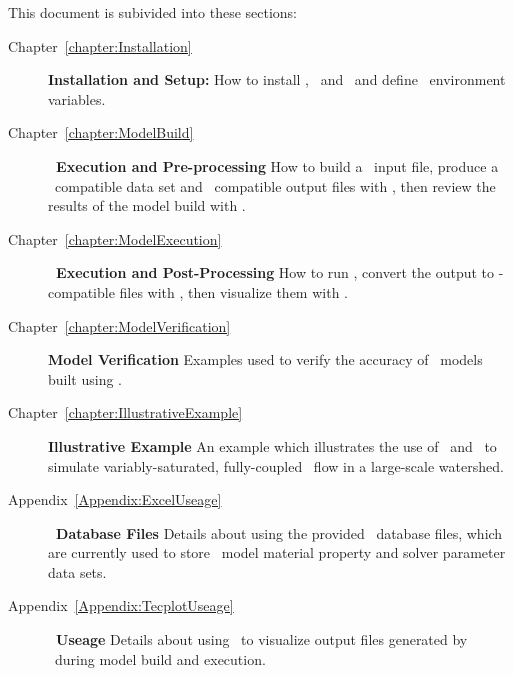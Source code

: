 This document is subivided into these sections:
\begin{description}
    \item[Chapter~\ref{chapter:Installation}]\textbf{Installation and Setup:} How to install \mut, \mfus\ and \tecplot\ and define \windows\ environment variables.
     \item[Chapter~\ref{chapter:ModelBuild}]\textbf{\mut\ Execution and Pre-processing} How to build a \mut\ input file, produce a \mfus\ compatible data set and \tecplot\ compatible output files with \mut, then review the results of the model build with \tecplot.
    \item[Chapter~\ref{chapter:ModelExecution}]\textbf{\mfus\ Execution and Post-Processing} How to run \mfus, convert the output to \tecplot-compatible files with \mut, then visualize them with \tecplot.
    \item[Chapter~\ref{chapter:ModelVerification}]\textbf{Model Verification} Examples used to verify the accuracy of \mfus\ models built using \mut.
    \item[Chapter~\ref{chapter:IllustrativeExample}]\textbf{Illustrative Example} An example which illustrates the use of \mut\ and \mfus\ to simulate variably-saturated, fully-coupled   \gwf\-\swf\ flow in a large-scale watershed.
    \item[Appendix~\ref{Appendix:ExcelUseage}]\textbf{\excel\ Database Files} Details about using the provided \excel\ database files, which are currently used to store \mfus\ model material property and solver parameter data sets.
    \item[Appendix~\ref{Appendix:TecplotUseage}]\textbf{\tecplot\ Useage} Details about using \tecplot\ to visualize output files generated by \mut\ during model build and execution.
        \end{description} 